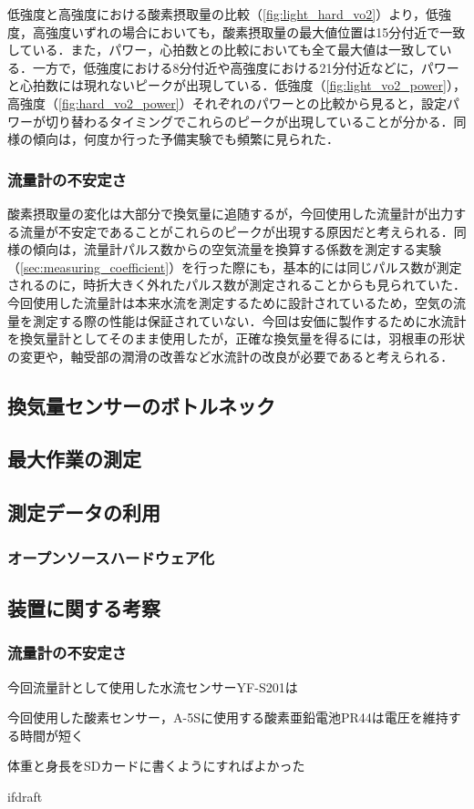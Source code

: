 低強度と高強度における酸素摂取量の比較（\ref{fig:light_hard_vo2}）より，低強度，高強度いずれの場合においても，酸素摂取量の最大値位置は15分付近で一致している．また，パワー，心拍数との比較においても全て最大値は一致している．一方で，低強度における8分付近や高強度における21分付近などに，パワーと心拍数には現れないピークが出現している．低強度（\ref{fig:light_vo2_power}），高強度（\ref{fig:hard_vo2_power}）それぞれのパワーとの比較から見ると，設定パワーが切り替わるタイミングでこれらのピークが出現していることが分かる．同様の傾向は，何度か行った予備実験でも頻繁に見られた．

\subsubsection{流量計の不安定さ}

酸素摂取量の変化は大部分で換気量に追随するが，今回使用した流量計が出力する流量が不安定であることがこれらのピークが出現する原因だと考えられる．同様の傾向は，流量計パルス数からの空気流量を換算する係数を測定する実験（\ref{sec:measuring_coefficient}）を行った際にも，基本的には同じパルス数が測定されるのに，時折大きく外れたパルス数が測定されることからも見られていた．今回使用した流量計は本来水流を測定するために設計されているため，空気の流量を測定する際の性能は保証されていない．今回は安価に製作するために水流計を換気量計としてそのまま使用したが，正確な換気量を得るには，羽根車の形状の変更や，軸受部の潤滑の改善など水流計の改良が必要であると考えられる．

\subsection{換気量センサーのボトルネック}

\subsection{最大作業の測定}



\subsection{測定データの利用}

\subsubsection{オープンソースハードウェア化}

\subsection{装置に関する考察}

\subsubsection{流量計の不安定さ}

今回流量計として使用した水流センサーYF-S201は

今回使用した酸素センサー，A-5Sに使用する酸素亜鉛電池PR44は電圧を維持する時間が短く

体重と身長をSDカードに書くようにすればよかった

\expandafter\ifx\csname ifdraft\endcsname\relax
  
\fi
